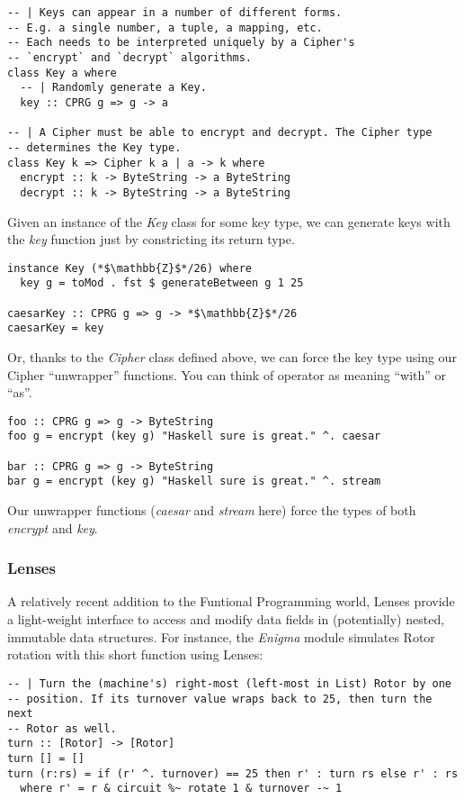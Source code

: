 \documentclass{article}
\begin{document}
\begin{lstlisting}
-- | Keys can appear in a number of different forms.
-- E.g. a single number, a tuple, a mapping, etc.
-- Each needs to be interpreted uniquely by a Cipher's
-- `encrypt` and `decrypt` algorithms.
class Key a where
  -- | Randomly generate a Key.
  key :: CPRG g => g -> a

-- | A Cipher must be able to encrypt and decrypt. The Cipher type
-- determines the Key type.
class Key k => Cipher k a | a -> k where
  encrypt :: k -> ByteString -> a ByteString
  decrypt :: k -> ByteString -> a ByteString  
\end{lstlisting}

Given an instance of the \emph{Key} class for some key type,
we can generate keys with the \emph{key} function just by constricting
its return type.

\begin{lstlisting}
instance Key (*$\mathbb{Z}$*/26) where
  key g = toMod . fst $ generateBetween g 1 25
  
caesarKey :: CPRG g => g -> *$\mathbb{Z}$*/26
caesarKey = key 
\end{lstlisting}

Or, thanks to the \emph{Cipher} class defined above, we can force the key
type using our Cipher ``unwrapper'' functions. You can think of 
 operator as meaning ``with'' or ``as''.

\begin{lstlisting}
foo :: CPRG g => g -> ByteString
foo g = encrypt (key g) "Haskell sure is great." ^. caesar

bar :: CPRG g => g -> ByteString
bar g = encrypt (key g) "Haskell sure is great." ^. stream
\end{lstlisting}

Our unwrapper functions (\emph{caesar} and \emph{stream} here) force the
types of both \emph{encrypt} and \emph{key}.

\subsubsection{Lenses}
A relatively recent addition to the Funtional Programming world, Lenses
provide a light-weight interface to access and modify data fields in
(potentially) nested,
immutable data structures. For instance, the \emph{Enigma} module
simulates Rotor rotation with this short function using Lenses:

\begin{lstlisting}
-- | Turn the (machine's) right-most (left-most in List) Rotor by one
-- position. If its turnover value wraps back to 25, then turn the next
-- Rotor as well.
turn :: [Rotor] -> [Rotor]
turn [] = []
turn (r:rs) = if (r' ^. turnover) == 25 then r' : turn rs else r' : rs
  where r' = r & circuit %~ rotate 1 & turnover -~ 1
\end{lstlisting}
\end{document}
